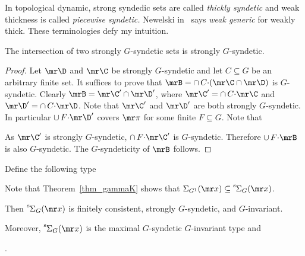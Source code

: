\noindent\llap{\textcolor{red}{\Large\warning}\kern1.5ex}\ignorespaces
In topological dynamic, strong syndedic sets are called \textit{thickly syndetic\/} and weak thickness is called \textit{piecewise syndetic.}
Newelski in~\cite{Newelski09} says \textit{weak generic\/} for weakly thick.
These terminologies defy my intuition.

\begin{lemma}\label{lem_strongly_syndetic}
  The intersection of two strongly $G$-syndetic sets is strongly $G$-syndetic.
\end{lemma}

\begin{proof}
  Let ${\mr\D}$ and ${\mr\C}$ be strongly $G$-syndetic and let $C\subseteq G$ be an arbitrary finite set.
  It suffices to prove that $\mrB=\cap\, C{\cdot}({\mr\C}\cap{\mr\D})$ is $G$-syndetic. 
  Clearly $\mrB={\mr\C'}\cap{\mr\D'}$, where ${\mr\C'}=\cap\, C{\cdot}{\mr\C}$ and ${\mr\D'}=\cap\, C{\cdot}{\mr\D}$.
  Note that ${\mr\C'}$ and ${\mr\D'}$ are both strongly $G$-syndetic.
  In particular $\cup\,F{\cdot}\mr\D'$ covers ${\mr\pi}$ for some finite $F\subseteq G$.
  Note that
  
  
  
  
  As ${\mr\C'}$ is strongly $G$-syndetic, $\cap\, F{\cdot}{\mr\C'}$ is $G$-syndetic.
  Therefore $\cup\,F{\cdot}\mrB$ is also $G$-syndetic.
  The $G$-syndeticity of $\mrB$ follows.
\end{proof}

Define the following type

\smallskip

Note that Theorem~\ref{thm_gammaK} shows that $\Sigma_{G^1}({\mr x})\subseteq{\mathstrut}^{\rm s}\kern-.1ex\Sigma_G({\mr x})$.

\begin{corollary}\label{corol_str_gen}
  Then ${\mathstrut}^{\rm s}\kern-.1ex\Sigma_G({\mr x})$ is finitely consistent, strongly $G$-syndetic, and $G$-invariant.\smallskip

  Moreover, ${\mathstrut}^{\rm s}\kern-.1ex\Sigma_G({\mr x})$ is the maximal $G$-syndetic $G$-invariant type and\medskip

  .
\end{corollary}

